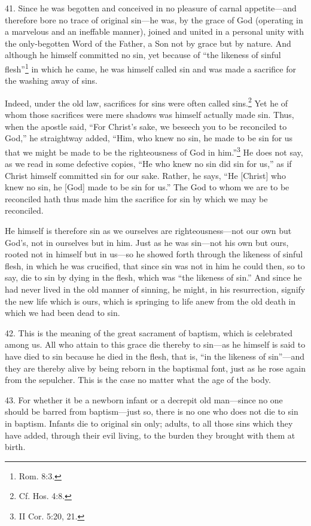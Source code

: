 
41. Since he was begotten and conceived in no pleasure of carnal appetite—and therefore bore no trace of original sin—he was, by the grace of God (operating in a marvelous and an ineffable manner), joined and united in a personal unity with the only-begotten Word of the Father, a Son not by grace but by nature. And although he himself committed no sin, yet because of ``the likeness of sinful flesh''\footnote{Rom. 8:3.} in which he came, he was himself called sin and was made a sacrifice for the washing away of sins.

Indeed, under the old law, sacrifices for sins were often called sins.\footnote{Cf. Hos. 4:8.} Yet he of whom those sacrifices were mere shadows was himself actually made sin. Thus, when the apostle said, ``For Christ's sake, we beseech you to be reconciled to God,'' he straightway added, ``Him, who knew no sin, he made to be sin for us that we might be made to be the righteousness of God in him.''\footnote{II Cor. 5:20, 21.} He does not say, as we read in some defective copies, ``He who knew no sin did sin for us,'' as if Christ himself committed sin for our sake. Rather, he says, ``He [Christ] who knew no sin, he [God] made to be sin for us.'' The God to whom we are to be reconciled hath thus made him the sacrifice for sin by which we may be reconciled.

He himself is therefore sin as we ourselves are righteousness—not our own but God's, not in ourselves but in him. Just as he was sin—not his own but ours, rooted not in himself but in us—so he showed forth through the likeness of sinful flesh, in which he was crucified, that since sin was not in him he could then, so to say, die to sin by dying in the flesh, which was ``the likeness of sin.'' And since he had never lived in the old manner of sinning, he might, in his resurrection, signify the new life which is ours, which is springing to life anew from the old death in which we had been dead to sin.

42. This is the meaning of the great sacrament of baptism, which is celebrated among us. All who attain to this grace die thereby to sin—as he himself is said to have died to sin because he died in the flesh, that is, ``in the likeness of sin''—and they are thereby alive by being reborn in the baptismal font, just as he rose again from the sepulcher. This is the case no matter what the age of the body.

43. For whether it be a newborn infant or a decrepit old man—since no one should be barred from baptism—just so, there is no one who does not die to sin in baptism. Infants die to original sin only; adults, to all those sins which they have added, through their evil living, to the burden they brought with them at birth.

